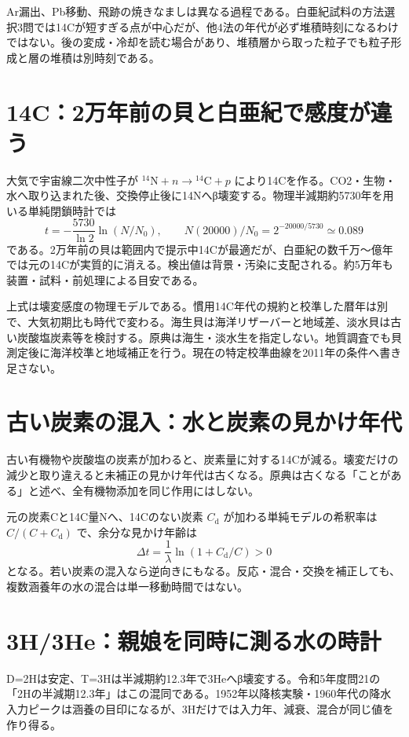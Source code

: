 Ar漏出、Pb移動、飛跡の焼きなましは異なる過程である。白亜紀試料の方法選択3問では14Cが短すぎる点が中心だが、他4法の年代が必ず堆積時刻になるわけではない。後の変成・冷却を読む場合があり、堆積層から取った粒子でも粒子形成と層の堆積は別時刻である。

\section{14C：2万年前の貝と白亜紀で感度が違う}
\label{theory:isotope:radiocarbon}
大気で宇宙線二次中性子が \({}^{14}\mathrm N+n\to{}^{14}\mathrm C+p\) により14Cを作る。CO2・生物・水へ取り込まれた後、交換停止後に14Nへβ壊変する。物理半減期約5730年を用いる単純閉鎖時計では
\[
 t=-\frac{5730}{\ln2}\ln(N/N_0),\qquad
 N(20000)/N_0=2^{-20000/5730}\simeq0.089
\]
である。2万年前の貝は範囲内で提示中14Cが最適だが、白亜紀の数千万〜億年では元の14Cが実質的に消える。検出値は背景・汚染に支配される。約5万年も装置・試料・前処理による目安である\cite{iso_radiometric}。

\begin{tcolorbox}[title=半減期を入れただけでは暦年にならない]
上式は壊変感度の物理モデルである。慣用14C年代の規約と校準した暦年は別で、大気初期比も時代で変わる。海生貝は海洋リザーバーと地域差、淡水貝は古い炭酸塩炭素等を検討する。原典は海生・淡水生を指定しない。地質調査でも貝測定後に海洋校準と地域補正を行う\cite{iso_shell}。現在の特定校準曲線を2011年の条件へ書き足さない。
\end{tcolorbox}

\section{古い炭素の混入：水と炭素の見かけ年代}
\label{theory:isotope:deadcarbon}
古い有機物や炭酸塩の炭素が加わると、炭素量に対する14Cが減る。壊変だけの減少と取り違えると未補正の見かけ年代は古くなる\cite{iso_deadcarbon}。原典は古くなる「ことがある」と述べ、全有機物添加を同じ作用にはしない。

元の炭素Cと14C量Nへ、14Cのない炭素 \(C_{\mathrm d}\) が加わる単純モデルの希釈率は \(C/(C+C_{\mathrm d})\) で、余分な見かけ年齢は
\[
 \Delta t=\frac1\lambda\ln(1+C_{\mathrm d}/C)>0
\]
となる。若い炭素の混入なら逆向きにもなる。反応・混合・交換を補正しても、複数涵養年の水の混合は単一移動時間ではない。

\section{3H/3He：親娘を同時に測る水の時計}
\label{theory:isotope:tritium}
D=2Hは安定、T=3Hは半減期約12.3年で3Heへβ壊変する\cite{iso_tritium2023}。令和5年度問21の「2Hの半減期12.3年」はこの混同である。1952年以降核実験・1960年代の降水入力ピークは涵養の目印になるが、3Hだけでは入力年、減衰、混合が同じ値を作り得る\cite{iso_tritium_clock}。

